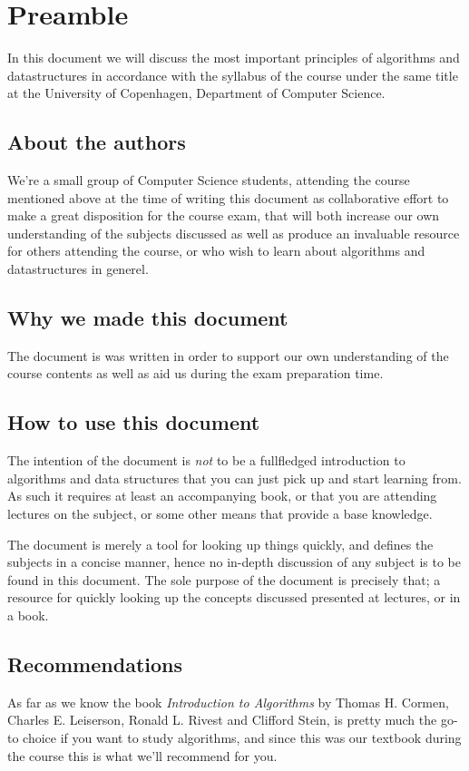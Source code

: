 
\newpage
\pagestyle{fancy}

\chapter{Preamble}
In this document we will discuss the most important principles of algorithms
and datastructures in accordance with the syllabus of the course under the
same title at the University of Copenhagen, Department of Computer Science.

\section*{About the authors}
We're a small group of Computer Science students, attending the course
mentioned above at the time of writing this document as collaborative effort
to make a great disposition for the course exam, that will both increase our
own understanding of the subjects discussed as well as produce an invaluable
resource for others attending the course, or who wish to learn about
algorithms and datastructures in generel.

\section*{Why we made this document}
The document is was written in order to support our own understanding of the
course contents as well as aid us during the exam preparation time.

\newpage
\pagestyle{fancy}
\section*{How to use this document}
The intention of the document is \textit{not} to be a fullfledged introduction
to algorithms and data structures that you can just pick up and start learning
from. As such it requires at least an accompanying book, or that you are
attending lectures on the subject, or some other means that provide a base
knowledge.

The document is merely a tool for looking up things quickly, and defines the
subjects in a concise manner, hence no in-depth discussion of any subject is
to be found in this document. The sole purpose of the document is precisely
that; a resource for quickly looking up the concepts discussed presented at
lectures, or in a book.

\section*{Recommendations}
As far as we know the book \textit{Introduction to Algorithms} by Thomas H.
Cormen, Charles E. Leiserson, Ronald L. Rivest and Clifford Stein, is pretty
much the go-to choice if you want to study algorithms, and since this was our
textbook during the course this is what we'll recommend for you.

